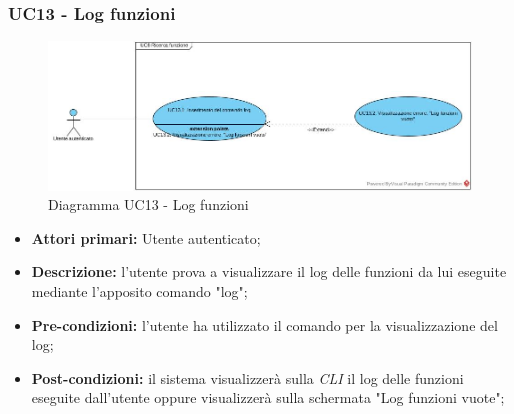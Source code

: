 \subsubsection{UC13 - Log funzioni}
\begin{figure}[h]
	\centering
	\includegraphics[width=\linewidth]{res/img/UC13.jpg}
	\caption{Diagramma UC13 - Log funzioni}
\end{figure}
\begin{itemize}
	\item \textbf{Attori primari:} Utente autenticato;
	\item \textbf{Descrizione:} l'utente prova a visualizzare il log delle funzioni da lui eseguite mediante l'apposito comando "log";
	\item \textbf{Pre-condizioni:} l'utente ha utilizzato il comando per la visualizzazione del log;
	\item \textbf{Post-condizioni:} il sistema visualizzerà sulla \textit{CLI\glo} il log delle funzioni eseguite dall'utente oppure visualizzerà sulla schermata "Log funzioni vuote";
\end{itemize}
